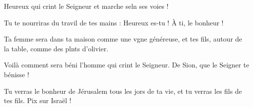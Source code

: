 \item Heureux qui crint le Seigneur\psstar{} et marche seln ses voies !
\item Tu te nourriras du travil de tes mains :\psstar{} Heureux es-tu ! À ti, le bonheur !
\item Ta femme sera dans ta maison comme une vgne généreuse,\psstar{} et tes fils, autour de la table, comme des plnts d’olivier.
\item Voilà comment sera béni l’homme qui crint le Seigneur.\psstar{} De Sion, que le Seigner te bénisse !
\item Tu verras le bonheur de Jérusalem tous les jors de ta vie,\psstar{} et tu verras les fils de tes fils. Pix sur Israël !